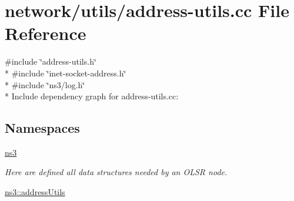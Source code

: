 \hypertarget{address-utils_8cc}{}\section{network/utils/address-\/utils.cc File Reference}
\label{address-utils_8cc}
{\ttfamily \#include \char`\"{}address-\/utils.\+h\char`\"{}}\\*
{\ttfamily \#include \char`\"{}inet-\/socket-\/address.\+h\char`\"{}}\\*
{\ttfamily \#include \char`\"{}ns3/log.\+h\char`\"{}}\\*
Include dependency graph for address-\/utils.cc\+:
\subsection*{Namespaces}
\begin{DoxyCompactItemize}
\item 
 \hyperlink{namespacens3}{ns3}
\begin{DoxyCompactList}\small\item\em Here are defined all data structures needed by an O\+L\+SR node. \end{DoxyCompactList}\item 
 \hyperlink{namespacens3_1_1addressUtils}{ns3\+::address\+Utils}
\end{DoxyCompactItemize}
